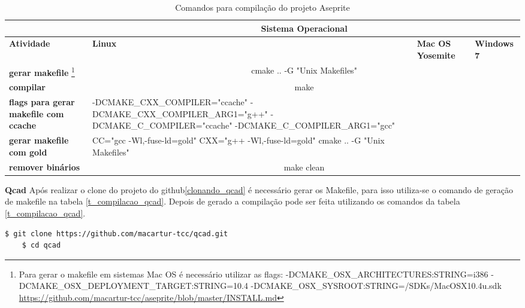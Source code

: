 \begin{itemize}
\begin{table}[h]
\begin{tabular}{p{3cm}p{5cm}p{5cm}p{5cm}}
\toprule
 & \multicolumn{3}{c}{Sistema Operacional} \\ \toprule 
\textbf{Atividade} & \textbf{Linux} & \textbf{Mac OS Yosemite} & \textbf{Windows 7}  \\ \midrule 
\textbf{gerar makefile} 
\footnote{Para gerar o makefile em sistemas Mac OS é necessário utilizar as flags:
 -DCMAKE\_OSX\_ARCHITECTURES:STRING=i386  -DCMAKE\_OSX\_DEPLOYMENT\_TARGET:STRING=10.4  -DCMAKE\_OSX\_SYSROOT:STRING=/SDKs/MacOSX10.4u.sdk
\url{https://github.com/macartur-tcc/aseprite/blob/master/INSTALL.md}}
 &  \multicolumn{3}{c}{cmake .. -G "Unix Makefiles"} \\ \midrule
\textbf{compilar} & \multicolumn{3}{c}{make } \\ \midrule
\textbf{flags para gerar makefile com ccache} & -DCMAKE\_CXX\_COMPILER="ccache"  
-DCMAKE\_CXX\_COMPILER\_ARG1="g++" -DCMAKE\_C\_COMPILER="ccache" -DCMAKE\_C\_COMPILER\_ARG1="gcc"  \\ \midrule
\textbf{gerar makefile com gold} & 
CC="gcc  -Wl,-fuse-ld=gold" CXX="g++ -Wl,-fuse-ld=gold" cmake .. -G "Unix Makefiles" \\ \midrule
\textbf{remover binários} & \multicolumn{3}{c}{make clean} \\ \bottomrule
\end{tabular} 
\caption{Comandos para compilação do projeto Aseprite}
\label{t_compilacao_aseprite}
\end{table}


    \subitem \textbf{Qcad}
       \subitem Após realizar o clone do projeto do github\ref{clonando_qcad}
 é necessário  gerar os Makefile, para isso utiliza-se o comando de geração de
 makefile na tabela \ref{t_compilacao_qcad}. Depois de gerado a compilação pode ser feita
 utilizando os comandos da tabela \ref{t_compilacao_qcad}.


\begin{lstlisting}[language=bash, caption={Clonado Projeto Qcad},
                  label=clonando_qcad]
    $ git clone https://github.com/macartur-tcc/qcad.git
    $ cd qcad
\end{lstlisting}



\end{itemize}
